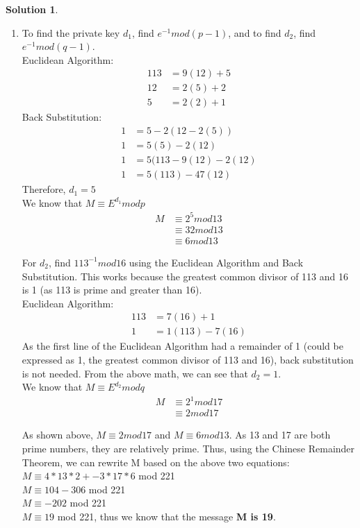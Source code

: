 \documentclass{article}
\theoremstyle{definition}
\newtheorem*{solution}{Solution}
\begin{document}
\begin{solution}
\begin{enumerate}[label=\alph*)]
    \item 
    To find the private key $d_1$, find $e^{-1} mod (p-1)$, and to find $d_2$, find $e^{-1} mod (q-1)$.\\
    Euclidean Algorithm:
    \begin{align*}
        113&= 9(12)+5\\
        12&=2(5)+2\\
        5&=2(2)+1
    \end{align*}
    Back Substitution:
    \begin{align*}
        1&=5-2(12-2(5))\\
        1&=5(5)-2(12)\\
        1&=5(113-9(12)-2(12)\\
        1&=5(113)-47(12)
    \end{align*}
    Therefore, $d_1=5$\\
    We know that $M\equiv E^{d_1} mod p$
    \begin{align*}
        M&\equiv 2^5 mod 13\\
        &\equiv 32 mod 13\\
        &\equiv 6 mod 13
    \end{align*}
    
    For $d_2$, find $113^{-1} mod 16$ using the Euclidean Algorithm and Back Substitution. This works because the greatest common divisor of 113 and 16 is 1 (as 113 is prime and greater than 16).\\
    Euclidean Algorithm:
    \begin{align*}
        113&=7(16)+1\\
        1&=1(113)-7(16)
    \end{align*}
    As the first line of the Euclidean Algorithm had a remainder of 1 (could be expressed as 1, the greatest common divisor of 113 and 16), back substitution is not needed. From the above math, we can see that $d_2=1$.\\
    We know that $M\equiv E^{d_2} mod q$
    \begin{align*}
        M&\equiv 2^1 mod 17\\
        &\equiv 2 mod 17
    \end{align*}
    
    As shown above, $M\equiv 2 mod 17$ and $M\equiv 6 mod 13$. As 13 and 17 are both prime numbers, they are relatively prime. Thus, using the Chinese Remainder Theorem, we can rewrite M based on the above two equations:\\
    $M\equiv4*13*2 + -3*17*6$ mod 221\\
    $M\equiv104-306$ mod 221\\
    $M\equiv -202$ mod 221\\
    $M\equiv 19$ mod 221, thus we know that the message \textbf{M is 19}.
\end{enumerate}
\end{solution}
\end{document}

